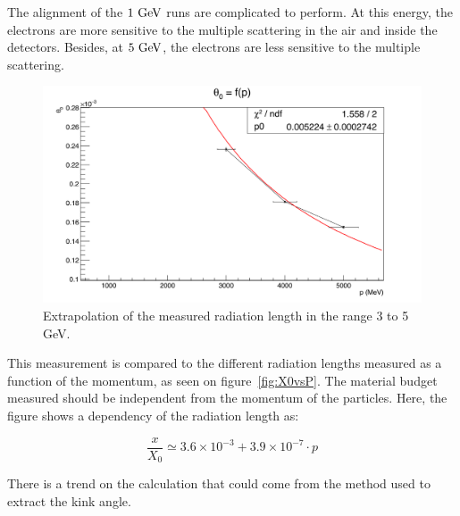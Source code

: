    The alignment of the $1~\rm{GeV}$ runs are complicated to perform.
   At this energy, the electrons are more sensitive to the multiple scattering in the air and inside the detectors.
   Besides, at $5~\rm{GeV}$, the electrons are less sensitive to the multiple scattering.
   
   \begin{figure}[!h]
     \centering
     \includegraphics[width = \textwidth]{Pictures/X0/theta0VsP_3-5GeV.png}
     \caption{Extrapolation of the measured radiation length in the range 3 to 5 GeV.}
     \label{fig:theta0vsP_3-5}
   \end{figure}

   This measurement is compared to the different radiation lengths measured as a function of the momentum, as seen on figure~\ref{fig:X0vsP}.
   The material budget measured should be independent from the momentum of the particles.
   Here, the figure shows a dependency of the radiation length as: 

   \begin{equation}
     \frac{x}{X_0} \simeq 3.6 \times 10^{-3} + 3.9 \times 10^{-7}\cdot p
   \end{equation}

   There is a trend on the calculation that could come from the method used to extract the kink angle.

